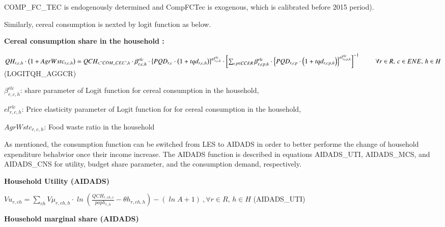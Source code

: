\documentclass[10pt,a4paper,titlepage,dvipdfmx]{book}
\begin{document}
COMP\_FC\_TEC  is endogenously determined and CompFCTec is exogenous, which is calibrated before 2015 period).

Similarly, cereal consumption is nexted by logit function as below.

\begin{flushleft}\textbf{Cereal consumption share in the household : }\end{flushleft}


\begin{center}$QH_{r,c,h}\cdot \left(1+AgrWstc_{r,c,h}\right)=QCH_{r,"COM\_ CEL",h}\cdot \beta _{r,c,h}^{rlc}\cdot \left\{PQD_{r,c}\cdot \left(1+tqd_{r,c,h}\right)\right\}^{el_{r,c,h}^{rlc}}\cdot \left[\sum _{cp\in CCER}\beta _{r,cp,h}^{rlc}\cdot \left\{PQD_{r,cp}\cdot \left(1+tqd_{r,cp,h}\right)\right\}^{el_{r,cp,h}^{rlc}}\right]^{-1}\,\,\,\,\,\,\,\,\,\,\,\,\,\,\forall r\in R,\,c\in ENE,\,h\in H$ (LOGITQH\_AGGCR)
\end{center}

\begin{flushleft}
$\beta _{r,c,h}^{rlc}$: share parameter of Logit function for cereal consumption in the household,

$el_{r,c,h}^{rlc}$: Price elasticity parameter of Logit function for for cereal consumption in the household,

$AgrWstc_{r,c,h}$: Food waste ratio in the household
\end{flushleft}

As mentioned, the consumption function can be switched from LES to AIDADS in order to better performe the change of household expenditure behabvior once their income increase. The AIDADS function is described in equations AIDADS\_UTI, AIDADS\_MCS, and AIDADS\_CNS for utility, budget share parameter, and the consumption demand, respectively.

\begin{flushleft}\textbf{Household Utility (AIDADS)}\end{flushleft}


\begin{center}$Vu_{r,ch}=\sum _{ch}V\mu _{r,ch,h}\cdot \mathit{\ln } \left(\frac{QCH_{r,ch,c}}{poph_{r,h}}-\theta h_{r,ch,h}\right)-\left(\mathit{\ln } A+1\right)~ ,\forall r\in R,\,h\in H$ (AIDADS\_UTI)
\end{center}

\begin{flushleft}\textbf{Household marginal share (AIDADS)}\end{flushleft}
\end{document}
